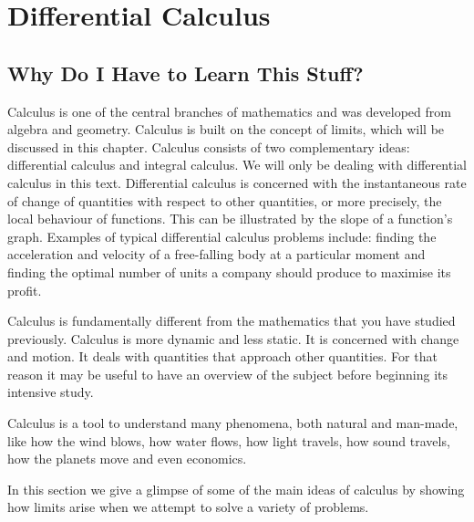 \chapter{Differential Calculus}
\label{m:fg:diff12}

\section{Why Do I Have to Learn This Stuff?}
Calculus is one of the central branches of mathematics and was developed from algebra and geometry. Calculus is built on the concept of limits, which will be discussed in this chapter. Calculus consists of two complementary ideas: differential calculus and integral calculus. We will only be dealing with differential calculus in this text. Differential calculus is concerned with the instantaneous rate of change of quantities with respect to other quantities, or more precisely, the local behaviour of functions. This can be illustrated by the slope of a function's graph. Examples of typical differential calculus problems include: finding the acceleration and velocity of a free-falling body at a particular moment and finding the optimal number of units a company should produce to maximise its profit.

Calculus is fundamentally different from the mathematics that you have studied previously. Calculus is more dynamic and less static. It is concerned with change and motion. It deals with quantities that approach other quantities. For that reason it may be useful to have an overview of the subject before beginning its intensive study. 

Calculus is a tool to understand many phenomena, both natural and man-made, like how the wind blows, how water flows, how light travels, how sound travels, how the planets move and even economics.

In this section we give a glimpse of some of the main ideas of calculus by showing how limits arise when we attempt to solve a variety of problems.


